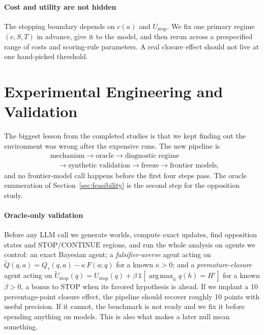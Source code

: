 \documentclass[10pt,letterpaper,twocolumn]{article}
\newcommand{\STOP}{\mathrm{STOP}}
\newcommand{\CONT}{\mathrm{CONTINUE}}
\newcommand{\Ind}{\mathbb{1}}
\newcommand{\Ustop}{U_{\mathrm{stop}}}
\DeclareMathOperator*{\argmax}{arg\,max}
\begin{document}
\paragraph{Cost and utility are not hidden}
The stopping boundary depends on $c(a)$ and $\Ustop$. We fix one primary regime $(c, S, T)$ in advance, give it to the model, and then rerun across a prespecified range of costs and scoring-rule parameters. A real closure effect should not live at one hand-picked threshold.

\section{Experimental Engineering and Validation}
\label{sec:validation}

The biggest lesson from the completed studies is that we kept finding out the environment was wrong after the expensive runs. The new pipeline is
\[
\begin{aligned}
&\text{mechanism} \to \text{oracle} \to \text{diagnostic regime}\\
&\quad\to \text{synthetic validation} \to \text{freeze} \to \text{frontier models},
\end{aligned}
\]
and no frontier-model call happens before the first four steps pass. The oracle enumeration of Section~\ref{sec:feasibility} is the second step for the opposition study.

\paragraph{Oracle-only validation}
\label{sec:gate1}
Before any LLM call we generate worlds, compute exact updates, find opposition states and $\STOP/\CONT$ regions, and run the whole analysis on agents we control: an exact Bayesian agent; a \emph{falsifier-averse} agent acting on $\tilde Q(q,a) = Q_\tau(q,a) - \kappa\,F(a;q)$ for a known $\kappa > 0$; and a \emph{premature-closure} agent acting on $\tilde U_{\mathrm{stop}}(q) = \Ustop(q) + \beta\,\Ind[\argmax_h q(h) = H']$ for a known $\beta > 0$, a bonus to $\STOP$ when its favored hypothesis is ahead. If we implant a 10 percentage-point closure effect, the pipeline should recover roughly 10 points with useful precision. If it cannot, the benchmark is not ready and we fix it before spending anything on models. This is also what makes a later null mean something.
\end{document}
